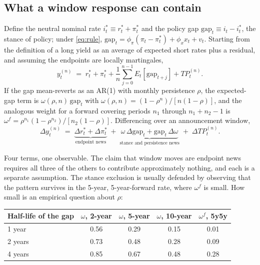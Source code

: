 \documentclass[11pt]{article}
\begin{document}
\subsection{What a window response can contain}

Define the neutral nominal rate $i^{*}_t \equiv r^{*}_t + \pi^{*}_t$ and the policy gap
$\text{gap}_t \equiv i_t - i^{*}_t$, the stance of policy; under \eqref{eq:rule},
$\text{gap}_t = \phi_\pi(\pi_t-\pi^{*}_t) + \phi_x x_t + v_t$. Starting from the definition of
a long yield as an average of expected short rates plus a residual, and assuming the endpoints
are locally martingales,
\begin{equation}
y^{(n)}_t \;=\; r^{*}_t + \pi^{*}_t + \frac{1}{n}\sum_{j=0}^{n-1} E_t\!\left[\text{gap}_{t+j}\right] + TP^{(n)}_t .
\label{eq:identity}
\end{equation}
If the gap mean-reverts as an AR(1) with monthly persistence $\rho$, the expected-gap term is
$\omega(\rho,n)\,\text{gap}_t$ with $\omega(\rho,n) = (1-\rho^{n})/[n(1-\rho)]$, and the
analogous weight for a forward covering periods $n_1$ through $n_1+n_2-1$ is
$\omega^{f} = \rho^{n_1}(1-\rho^{n_2})/[n_2(1-\rho)]$. Differencing over an announcement
window,
\begin{equation}
\Delta y^{(n)}_t \;=\; \underbrace{\Delta r^{*}_t + \Delta \pi^{*}_t}_{\text{endpoint news}}
\;+\; \underbrace{\omega\,\Delta\text{gap}_t + \text{gap}_t\,\Delta\omega}_{\text{stance and persistence news}}
\;+\; \Delta TP^{(n)}_t .
\label{eq:windowdiff}
\end{equation}

Four terms, one observable. The claim that window moves are endpoint news requires all three
of the others to contribute approximately nothing, and each is a separate assumption. The
stance exclusion is usually defended by observing that the pattern survives in the 5-year,
5-year-forward rate, where $\omega^{f}$ is small. How small is an empirical question about
$\rho$:

\begin{center}\small
\begin{tabular}{lcccc}
\toprule
Half-life of the gap & $\omega$, 2-year & $\omega$, 5-year & $\omega$, 10-year & $\omega^{f}$, 5y5y\\ \midrule
1 year  & 0.56 & 0.29 & 0.15 & 0.01\\
2 years & 0.73 & 0.48 & 0.28 & 0.09\\
4 years & 0.85 & 0.67 & 0.48 & 0.28\\
\bottomrule\end{tabular}
\end{center}
\end{document}
